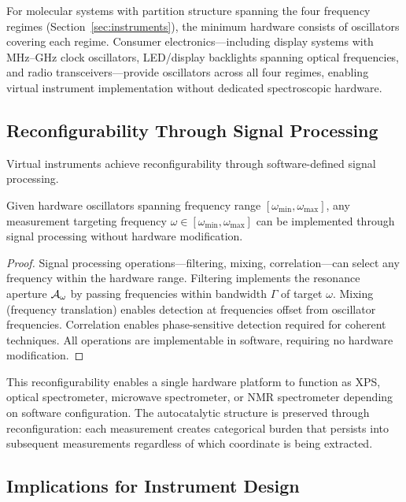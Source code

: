 For molecular systems with partition structure spanning the four frequency regimes (Section~\ref{sec:instruments}), the minimum hardware consists of oscillators covering each regime. Consumer electronics—including display systems with MHz–GHz clock oscillators, LED/display backlights spanning optical frequencies, and radio transceivers—provide oscillators across all four regimes, enabling virtual instrument implementation without dedicated spectroscopic hardware.

\subsection{Reconfigurability Through Signal Processing}

Virtual instruments achieve reconfigurability through software-defined signal processing.

\begin{theorem}
\label{thm:reconfigurability}
Given hardware oscillators spanning frequency range $[\omega_{\mathrm{min}}, \omega_{\mathrm{max}}]$, any measurement targeting frequency $\omega \in [\omega_{\mathrm{min}}, \omega_{\mathrm{max}}]$ can be implemented through signal processing without hardware modification.
\end{theorem}

\begin{proof}
Signal processing operations—filtering, mixing, correlation—can select any frequency within the hardware range. Filtering implements the resonance aperture $\mathcal{A}_\omega$ by passing frequencies within bandwidth $\Gamma$ of target $\omega$. Mixing (frequency translation) enables detection at frequencies offset from oscillator frequencies. Correlation enables phase-sensitive detection required for coherent techniques. All operations are implementable in software, requiring no hardware modification.
\end{proof}

This reconfigurability enables a single hardware platform to function as XPS, optical spectrometer, microwave spectrometer, or NMR spectrometer depending on software configuration. The autocatalytic structure is preserved through reconfiguration: each measurement creates categorical burden that persists into subsequent measurements regardless of which coordinate is being extracted.

\subsection{Implications for Instrument Design}

